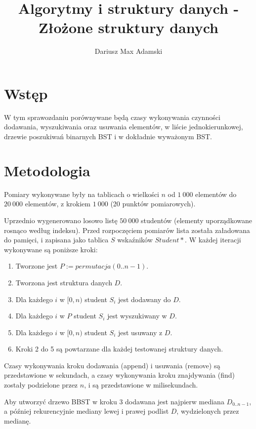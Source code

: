\documentclass[11pt,twocolumn]{article}
\title{Algorytmy i struktury danych - Złożone struktury danych}
\author{Dariusz Max Adamski}
\date{}
\begin{document}
\maketitle



\section*{Wstęp}

W tym sprawozdaniu porównywane będą czasy wykonywania czynności dodawania, wyszukiwania oraz usuwania elementów, w liście jednokierunkowej, drzewie poszukiwań binarnych BST i w dokładnie wyważonym BST.



\section*{Metodologia}

Pomiary wykonywane były na tablicach o wielkości $n$ od $1\ 000$ elementów do $20\ 000$ elementów, z krokiem $1\ 000$ (20 punktów pomiarowych).

Uprzednio wygenerowano losowo listę $50\ 000$ studentów (elementy uporządkowane rosnąco według indeksu). Przed rozpoczęciem pomiarów lista została załadowana do pamięci, i zapisana jako tablica $S$ wskaźników $Student*$. W każdej iteracji wykonywane są poniższe kroki:

\begin{enumerate}
	\item Tworzone jest $P := permutacja(0..n-1)$.
	\item Tworzona jest struktura danych $D$.
	\item Dla każdego $i$ w $[0,n)$ student $S_i$ jest dodawany do $D$.
	\item Dla każdego $i$ w $P$ student $S_i$ jest wyszukiwany w $D$.
	\item Dla każdego $i$ w $[0,n)$ student $S_i$ jest usuwany z $D$.
	\item Kroki 2 do 5 są powtarzane dla każdej testowanej struktury danych.
\end{enumerate}

Czasy wykonywania kroku dodawania (append) i usuwania (remove) są przedstawione w sekundach, a czasy wykonywania kroku znajdywania (find) zostały podzielone przez $n$, i są przedstawione w milisekundach.

Aby utworzyć drzewo BBST w kroku 3 dodawana jest najpierw mediana $D_{0..n-1}$, a później rekurencyjnie mediany lewej i prawej podlist $D$, wydzielonych przez medianę.
\end{document}
